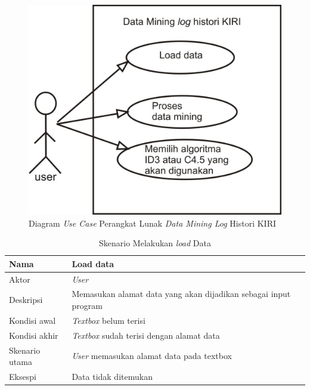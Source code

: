 \begin{figure}[H]
\includegraphics[scale=1]{Gambar/usecase.jpg}
\caption[Diagram \textsl{Use Case} Perangkat Lunak \textsl{Data Mining Log} Histori KIRI]{Diagram \textsl{Use Case} Perangkat Lunak \textsl{Data Mining Log} Histori KIRI} 
\label{fig:diagramUseCase}
\end{figure}

\begin{table}[H]
\caption{Skenario Melakukan \textsl{load} Data}
\begin{tabular}{|l|l|}
\hline
Nama           & Load data                                                       \\ \hline
Aktor          & \textit{User}                                                   \\ \hline
Deskripsi      & Memasukan alamat data yang akan dijadikan sebagai input program \\ \hline
Kondisi awal   & \textsl{Textbox} belum terisi                                   \\ \hline
Kondisi akhir  & \textsl{Textbox} sudah terisi dengan alamat data                \\ \hline
Skenario utama & \textit{User} memasukan alamat data pada textbox                \\ \hline
Eksespi        & Data tidak ditemukan                                            \\ \hline
\end{tabular}
\end{table}


